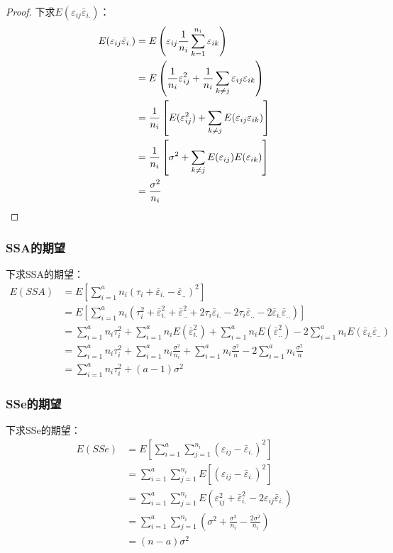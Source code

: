 \begin{proof}
	下求$E(\varepsilon_{ij}\bar{\varepsilon}_{i.})$：
	\begin{align*}
		E(\varepsilon_{ij}\bar{\varepsilon}_{i.})
		&=E\left(\varepsilon_{ij}\frac{1}{n_i}\sum_{k=1}^{n_i}\varepsilon_{ik}\right) \\
		&=E\left(\frac{1}{n_i}\varepsilon_{ij}^2+\frac{1}{n_i}\sum_{k\ne j}\varepsilon_{ij}\varepsilon_{ik}\right) \\
		&=\frac{1}{n_i}\left[E(\varepsilon_{ij}^2)+\sum_{k\ne j}E(\varepsilon_{ij}\varepsilon_{ik})\right] \\
		&=\frac{1}{n_i}\left[\sigma^2+\sum_{k\ne j}E(\varepsilon_{ij})E(\varepsilon_{ik})\right] \\
		&=\frac{\sigma^2}{n_i}\qedhere
	\end{align*}
\end{proof}
\subsubsection{SSA的期望}
下求SSA的期望：
\begin{align*}
	E(SSA)
	&=E\left[\sum_{i=1}^an_i(\tau_i+\bar{\varepsilon}_{i.}-\bar{\varepsilon}_{..})^2\right] \\
	&=E\left[\sum_{i=1}^an_i(\tau_i^2+\bar{\varepsilon}_{i.}^2+\bar{\varepsilon}_{..}^2+2\tau_i\bar{\varepsilon}_{i.}-2\tau_i\bar{\varepsilon}_{..}-2\bar{\varepsilon}_{i.}\bar{\varepsilon}_{..})\right] \\
	&=\sum_{i=1}^an_i\tau_i^2+\sum_{i=1}^an_iE(\bar{\varepsilon}_{i.}^2)+\sum_{i=1}^an_iE(\bar{\varepsilon}_{..}^2)-2\sum_{i=1}^an_iE(\bar{\varepsilon}_{i.}\bar{\varepsilon}_{..}) \\
	&=\sum_{i=1}^an_i\tau_i^2+\sum_{i=1}^an_i\frac{\sigma^2}{n_i}+\sum_{i=1}^an_i\frac{\sigma^2}{n}-2\sum_{i=1}^an_i\frac{\sigma^2}{n} \\
	&=\sum_{i=1}^an_i\tau_i^2+(a-1)\sigma^2
\end{align*}
\subsubsection{SSe的期望}
下求SSe的期望：
\begin{align*}
	E(SSe)
	&=E\left[\sum_{i=1}^a\sum_{j=1}^{n_i}(\varepsilon_{ij}-\bar{\varepsilon}_{i.})^2\right] \\
	&=\sum_{i=1}^a\sum_{j=1}^{n_i}E[(\varepsilon_{ij}-\bar{\varepsilon}_{i.})^2] \\
	&=\sum_{i=1}^a\sum_{j=1}^{n_i}E(\varepsilon_{ij}^2+\bar{\varepsilon}_{i.}^2-2\varepsilon_{ij}\bar{\varepsilon}_{i.}) \\
	&=\sum_{i=1}^a\sum_{j=1}^{n_i}\left(\sigma^2+\frac{\sigma^2}{n_i}-\frac{2\sigma^2}{n_i}\right) \\
	&=(n-a)\sigma^2
\end{align*}
